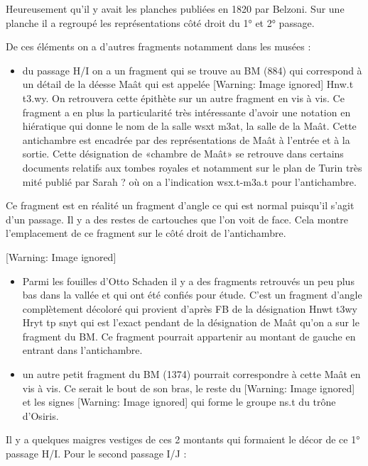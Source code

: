 \documentclass{article}
\begin{document}
Heureusement qu’il y avait les planches publiées en 1820 par Belzoni.
Sur une planche il a regroupé les représentations côté droit du 1° et
2° passage. 

De ces éléments  on a d’autres fragments notamment dans les musées : 

\begin{itemize}
\item du passage H/I on a un fragment qui se trouve au BM (884) qui
correspond à un détail de la déesse Maât qui est appelée   [Warning:
Image ignored] %
   Hnw.t t3.wy. On retrouvera cette épithète sur un autre fragment en
vis à vis. Ce fragment a en plus la particularité très intéressante
d’avoir une notation en hiératique qui donne le nom de la salle  wsxt 
m3at, la salle de la Maât. Cette antichambre est encadrée par des
représentations de Maât à l’entrée et à la sortie. Cette désignation de
«chambre de Maât» se retrouve dans certains documents relatifs aux
tombes royales et notamment sur le plan de Turin très mité publié par
Sarah ? où on a l’indication wsx.t-m3a.t  pour l’antichambre.
\end{itemize}
Ce fragment est en réalité un fragment d’angle ce qui est normal
puisqu’il s’agit d’un passage. Il y a des restes de cartouches que l’on
voit de face. Cela montre l’emplacement de ce fragment sur le côté
droit de l’antichambre.

  [Warning: Image ignored] %
 

\begin{itemize}
\item Parmi les fouilles d’Otto Schaden il y a des fragments retrouvés
un peu plus bas dans la vallée et qui ont été confiés pour étude. C’est
un fragment d’angle complètement décoloré qui provient d’après FB de la
désignation Hnwt t3wy Hryt tp snyt qui est l’exact pendant de la
désignation de Maât qu’on a sur le fragment du BM. Ce fragment pourrait
appartenir au montant de gauche en entrant dans l’antichambre. 
\end{itemize}
\begin{itemize}
\item un autre petit fragment du BM (1374) pourrait correspondre à cette
Maât en vis à vis. Ce serait le bout de son bras, le reste du  
[Warning: Image ignored] %
   et les signes    [Warning: Image ignored]
   qui forme le groupe ns.t du trône d’Osiris.
\end{itemize}
Il y a quelques maigres vestiges de ces 2 montants qui formaient le
décor de ce 1° passage H/I. Pour le second passage  I/J :
\end{document}
